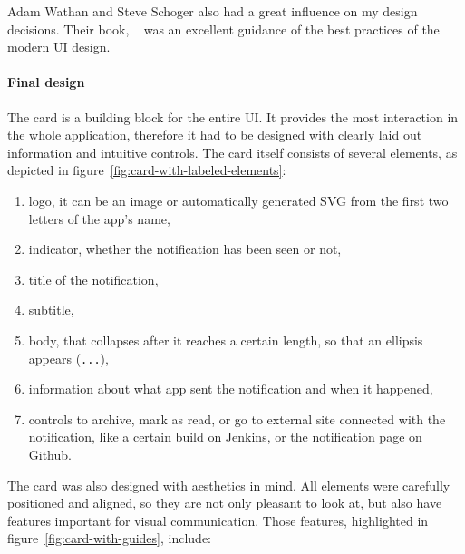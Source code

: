Adam Wathan and Steve Schoger
also had a great influence
on my design decisions.
Their book,
~\cite{wathan_refactoring_2018}
was an excellent guidance of the best practices
of the modern \ac{UI} design.

\paragraph{Final design}\label{sec:final-design}

The card is a building block for the entire \ac{UI}.
It provides the most interaction in the whole application,
therefore it had to be designed with clearly laid out information
and intuitive controls.
The card itself consists of several elements,
as depicted in figure~\ref{fig:card-with-labeled-elements}:

\begin{enumerate}
      \item
            logo,
            it can be an image
            or automatically generated \ac{SVG}
            from the first two letters of the app's name,
      \item
            indicator,
            whether the notification has been seen or not,
      \item
            title of the notification,
      \item
            subtitle,
      \item
            body,
            that collapses after it reaches a certain length,
            so that an ellipsis appears (\texttt{...}),
      \item
            information about what app sent the notification and when it happened,
      \item
            controls to archive,
            mark as read,
            or go to external site connected with the notification,
            like a certain build on Jenkins,
            or the notification page on Github.
\end{enumerate}

The card was also designed with aesthetics in mind.
All elements were carefully positioned and aligned,
so they are not only pleasant to look at,
but also have features important for visual communication.
Those features, highlighted in figure~\ref{fig:card-with-guides}, include:

